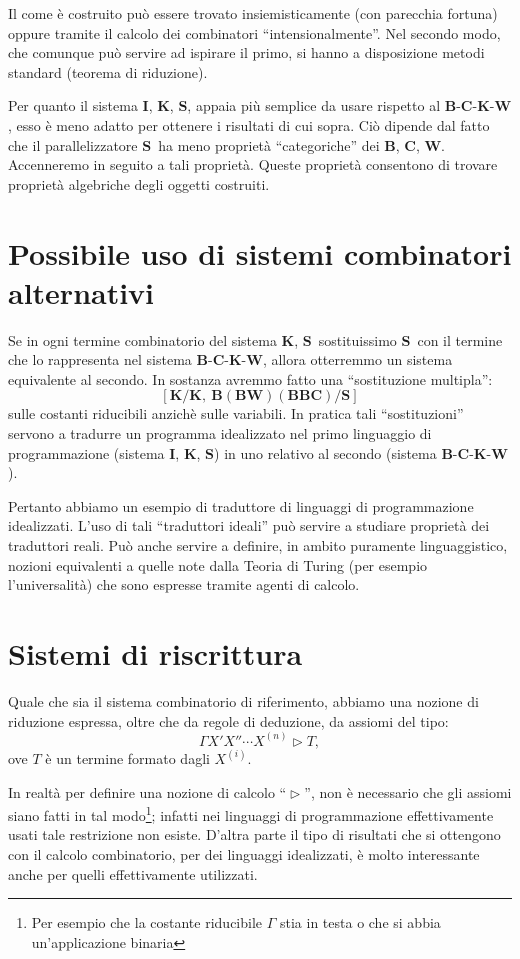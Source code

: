 \documentclass{book}
\newcommand*{\II}{$\mathbf{I}$}    %
\newcommand*{\KK}{$\mathbf{K}$}    %
\newcommand*{\SSS}{$\mathbf{S}$}   %
\newcommand*{\CC}{$\mathbf{C}$}    %
\newcommand*{\BB}{$\mathbf{B}$}    %
\newcommand*{\WW}{$\mathbf{W}$}    %
\newcommand*{\kk}{\mathbf{K}}    %
\newcommand*{\sss}{\mathbf{S}}   %
\newcommand*{\cc}{\mathbf{C}}    %
\newcommand*{\bb}{\mathbf{B}}    %
\newcommand*{\ww}{\mathbf{W}}    %
\begin{document}
Il come \`e costruito pu\`o essere trovato insiemisticamente (con parecchia
fortuna) oppure tramite il calcolo dei combinatori ``intensionalmente''. Nel
secondo modo, che comunque pu\`o servire ad ispirare il primo, si hanno a 
disposizione metodi standard (teorema di riduzione).

Per quanto il sistema \II, \KK, \SSS, appaia pi\`u semplice da usare rispetto
al \BB-\CC-\KK-\WW, esso \`e meno adatto per ottenere i risultati di cui 
sopra. Ci\`o dipende dal fatto che il parallelizzatore \SSS~ha meno propriet\`a
``categoriche'' dei \BB, \CC, \WW. Accenneremo in seguito a tali 
propriet\`a. Queste propriet\`a consentono di trovare propriet\`a algebriche
degli oggetti costruiti.

\section{Possibile uso di sistemi combinatori alternativi}
Se in ogni termine combinatorio del sistema \KK, \SSS~sostituissimo \SSS~con il
termine che lo rappresenta nel sistema \BB-\CC-\KK-\WW, allora otterremmo un
sistema equivalente al secondo. In sostanza avremmo fatto una ``sostituzione 
multipla'': $$[\kk / \kk,\ \bb (\bb \ww ) ( \bb \bb \cc ) / \sss ]$$ sulle 
costanti riducibili
anzich\`e sulle variabili. In pratica tali ``sostituzioni'' servono a tradurre
un programma idealizzato nel primo linguaggio di programmazione (sistema \II, 
\KK, \SSS) in uno relativo al secondo (sistema \BB-\CC-\KK-\WW).

Pertanto abbiamo un esempio di traduttore di linguaggi di programmazione
idealizzati. L'uso di tali ``traduttori ideali'' pu\`o servire a studiare 
propriet\`a dei traduttori reali. Pu\`o anche servire a definire, in ambito
puramente linguaggistico, nozioni equivalenti a quelle note dalla Teoria di 
Turing (per esempio l'universalit\`a) che sono espresse tramite agenti di 
calcolo.

\section{Sistemi di riscrittura}
Quale che sia il sistema combinatorio di riferimento, abbiamo una nozione di
riduzione espressa, oltre che da regole di deduzione, da assiomi del tipo:
\[
\Gamma X' X'' \cdots X^{(n)} \vartriangleright T,
\] 
ove $T$ \`e un termine formato dagli $X^{(i)}$.

In realt\`a per definire una nozione di calcolo ``$\vartriangleright$'', non
\`e necessario che gli assiomi siano fatti in tal modo\footnote{Per esempio che
la costante riducibile $\Gamma$ stia in testa o che si abbia un'applicazione
binaria};  infatti nei linguaggi di programmazione effettivamente usati tale
restrizione non esiste. D'altra parte il tipo di risultati che si ottengono con
il calcolo combinatorio, per dei linguaggi idealizzati, \`e molto interessante
anche per quelli effettivamente utilizzati.
\end{document}
